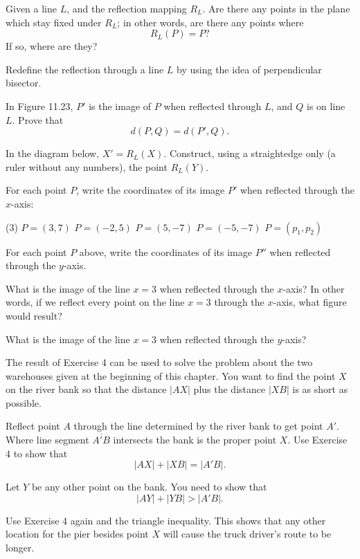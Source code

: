 \documentclass[12pt]{book} %
\begin{document}
\begin{ExerciseList}
\begin{ExerciseList}
\Exercise Given a line $L$, and the reflection mapping $R_L$. Are there any points in the plane which stay fixed under $R_L$; in other words, are there any points where
\[
R_L(P)=P?
\]
If so, where are they?

\Exercise Redefine the reflection through a line $L$ by using the idea of perpendicular bisector.

\Exercise In Figure 11.23, $P'$ is the image of $P$ when reflected through $L$, and $Q$ is on line $L$. Prove that
\[
d(P,Q)=d(P',Q).
\]


\Exercise In the diagram below, $X'=R_L(X)$. Construct, using a straightedge only (a ruler without any numbers), the point $R_L(Y)$.


\Exercise For each point $P$, write the coordinates of its image $P'$ when reflected through the $x$-axis:
\begin{tasks}(3)
\task[(a)] $P=(3,7)$
\task[(b)] $P=(-2,5)$
\task[(c)] $P=(5,-7)$
\task[(d)] $P=(-5,-7)$
\task[(e)] $P=(p_1,p_2)$
\end{tasks}

\Exercise For each point $P$ above, write the coordinates of its image $P''$ when reflected through the $y$-axis.

\Exercise What is the image of the line $x=3$ when reflected through the $x$-axis? In other words, if we reflect every point on the line $x=3$ through the $x$-axis, what figure would result?

\Exercise What is the image of the line $x=3$ when reflected through the $y$-axis?

\Exercise The result of Exercise 4 can be used to solve the problem about the two warehouses given at the beginning of this chapter. You want to find the point $X$ on the river bank so that the distance $|AX|$ plus the distance $|XB|$ is as short as possible.


Reflect point $A$ through the line determined by the river bank to get point $A'$. Where line segment $\overline{A'B}$ intersects the bank is the proper point $X$. Use Exercise 4 to show that
\[
|AX|+|XB|=|A'B|.
\]

Let $Y$ be any other point on the bank. You need to show that
\[
|AY|+|YB|>|A'B|.
\]

Use Exercise 4 again and the triangle inequality. This shows that any other location for the pier besides point $X$ will cause the truck driver's route to be longer.


\end{ExerciseList}
\end{ExerciseList}
\end{document}
